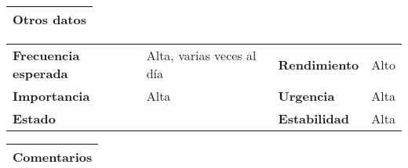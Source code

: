 \documentclass[11pt,a4paper]{article}
\begin{document}
\begin{table}[H]
	\begin{tabularx}{\textwidth}{X}
		\textbf{Otros datos}\\ \hline
	\end{tabularx}
	\begin{tabularx}{\textwidth}{lXlX}
		\textbf{Frecuencia esperada} & Alta, varias veces al día & \textbf{Rendimiento} & Alto\\
		\textbf{Importancia} & Alta & \textbf{Urgencia} & Alta\\
		\textbf{Estado} &  & \textbf{Estabilidad} & Alta \\
	\end{tabularx}
	
	\begin{tabularx}{\textwidth}{X}
		\textbf{Comentarios}\\ \hline
	\end{tabularx}
\end{table}

\newpage


\end{document}
